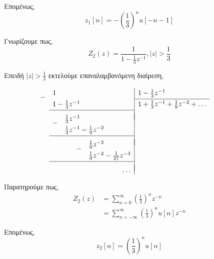 \documentclass{assignment}
\newcommand{\dropsign}[1]{\smash{\llap{\raisebox{-.5\normalbaselineskip}{$#1$\hspace{2\arraycolsep}}}}}%
\newcommand{\longdivline}{\cline{1-1} \\[\dimexpr-\normalbaselineskip+\jot]}
\begin{document}
\begin{answers}
Επομένως,
\begin{equation*}
z_1[n] = -\left(\frac{1}{3}\right)^nu[-n-1]
\end{equation*}

Γνωρίζουμε πως,
\begin{equation*}
Z_2(z) = \frac{1}{1-\frac{1}{3}z^{-1}}, |z| > \frac{1}{3}
\end{equation*}

Επειδή $|z| > \frac{1}{3}$ εκτελούμε επαναλαμβανόμενη διαίρεση,

\begin{equation*}
  \setlength\extrarowheight{2pt}
  \begin{array}{r|l}
    \dropsign{-} 1\hphantom{{}+{}\frac{0}{1}z^{-1}{}+{}\frac{0}{1}z^{-2}{}+{}\frac{0}{01}z^{-3}}& 1 -\frac{1}{3}z^{-1} \\[2pt] \cline{2-2}
    1 - \frac{1}{3}z^{-1}\hphantom{{}+{}\frac{0}{1}z^{-2}{}+{}\frac{0}{01}z^{-3}}& 1 + \frac{1}{3}z^{-1} + \frac{1}{9}z^{-2}  + \dots \\[2pt] \longdivline
    \dropsign{-} \frac{1}{3}z^{-1}\hphantom{{}-{}\frac{0}{1}z^{-2}{}+{}\frac{0}{01}z^{-3}}&\\[2pt]
                 \frac{1}{3}z^{-1} - \frac{1}{9}z^{-2}\hphantom{{}+{}\frac{0}{01}z^{-3}}&\\[2pt] \longdivline
    \dropsign{-} \frac{1}{9}z^{-2}\hphantom{{}-{}\frac{0}{01}z^{-3}}&\\[2pt]
                 \frac{1}{9}z^{-2} - \frac{1}{27}z^{-3}&\\[2pt] \longdivline
                        \dots&
  \end{array}
\end{equation*}

Παρατηρούμε πως,
\begin{align*}
Z_2(z) &= \sum_{n=0}^{\infty} \left(\frac{1}{3}\right)^nz^{-n} \\
       &= \sum_{n=-\infty}^{\infty} \left(\frac{1}{3}\right)^nu[n]z^{-n}
\end{align*}

Επομένως,
\begin{equation*}
z_2[n] = \left(\frac{1}{3}\right)^nu[n]
\end{equation*}

\end{answers}

\end{document}
